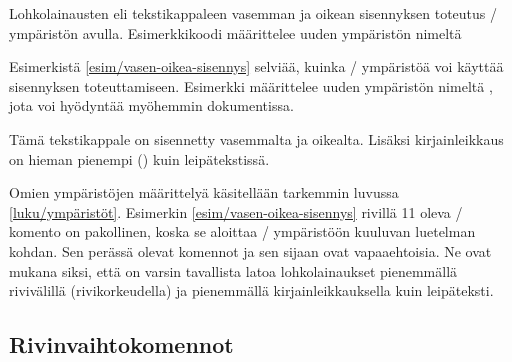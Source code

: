 \begin{esimerkki*}

\begin{koodilohko}
\newenvironment{lohkolainaus}{%
  \begin{list}{}{
      \setlength{\leftmargin}{1cm}
      \setlength{\rightmargin}{1cm}
      \setlength{\itemindent}{0bp}
      \setlength{\listparindent}{\parindent}
      \setlength{\parsep}{\parskip}
      \setlength{\topsep}{1em}
      \setlength{\partopsep}{0bp}
    }
  \item\linespread{1}\small
  }{\end{list}}
\end{koodilohko}
  \caption{Lohkolainausten eli tekstikappaleen vasemman ja oikean
    sisennyksen toteutus \-/ ympäristön avulla.
    Esimerkkikoodi määrittelee uuden ympäristön nimeltä
    }
  \label{esim/vasen-oikea-sisennys}
\end{esimerkki*}

Esimerkistä \ref{esim/vasen-oikea-sisennys} selviää, kuinka
\-/ ympäristöä voi käyttää sisennyksen toteuttamiseen.
Esimerkki määrittelee uuden ympäristön nimeltä
, jota voi hyödyntää myöhemmin dokumentissa.

\begin{koodilohkosis}
\begin{lohkolainaus}
  Tämä tekstikappale on sisennetty vasemmalta ja oikealta. Lisäksi
  kirjainleikkaus on hieman pienempi (\small) kuin leipätekstissä.
\end{lohkolainaus}
\end{koodilohkosis}

Omien ympäristöjen määrittelyä käsitellään tarkemmin luvussa
\ref{luku/ympäristöt}. Esimerkin \ref{esim/vasen-oikea-sisennys} rivillä
11 oleva \-/ komento on pakollinen, koska se aloittaa
\-/ ympäristöön kuuluvan luetelman kohdan. Sen perässä
olevat komennot  ja  sen sijaan ovat
vapaaehtoisia. Ne ovat mukana siksi, että on varsin tavallista latoa
lohkolainaukset pienemmällä rivivälillä (rivikorkeudella) ja pienemmällä
kirjainleikkauksella kuin leipäteksti.

\subsection{Rivinvaihtokomennot}
\label{luku/rivinvaihtokomennot}

